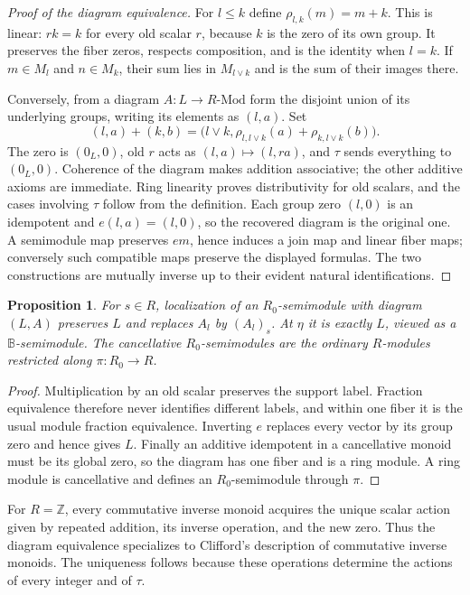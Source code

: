 \documentclass[11pt]{amsart}
\newcommand{\B}{\mathbb B}
\newcommand{\Z}{\mathbb Z}
\newcommand{\Mod}{\mathrm{Mod}}
\newtheorem{proposition}[theorem]{Proposition}
\theoremstyle{definition}
\theoremstyle{remark}
\begin{document}
\begin{proof}[Proof of the diagram equivalence]
For $l\le k$ define $\rho_{l,k}(m)=m+k$. This is linear: $rk=k$ for every old scalar $r$, because $k$ is the zero of its own group. It preserves the fiber zeros, respects composition, and is the identity when $l=k$. If $m\in M_l$ and $n\in M_k$, their sum lies in $M_{l\vee k}$ and is the sum of their images there.

Conversely, from a diagram $A:L\to R\text{-}\Mod$ form the disjoint union of its underlying groups, writing its elements as $(l,a)$. Set
\[
 (l,a)+(k,b)=\bigl(l\vee k,\rho_{l,l\vee k}(a)+\rho_{k,l\vee k}(b)\bigr).
\]
The zero is $(0_L,0)$, old $r$ acts as $(l,a)\mapsto(l,ra)$, and $\tau$ sends everything to $(0_L,0)$. Coherence of the diagram makes addition associative; the other additive axioms are immediate. Ring linearity proves distributivity for old scalars, and the cases involving $\tau$ follow from the definition. Each group zero $(l,0)$ is an idempotent and $e(l,a)=(l,0)$, so the recovered diagram is the original one. A semimodule map preserves $em$, hence induces a join map and linear fiber maps; conversely such compatible maps preserve the displayed formulas. The two constructions are mutually inverse up to their evident natural identifications.
\end{proof}

\begin{proposition}\label{prop:genericmodule}
For $s\in R$, localization of an $R_0$-semimodule with diagram $(L,A)$ preserves $L$ and replaces $A_l$ by $(A_l)_s$. At $\eta$ it is exactly $L$, viewed as a $\B$-semimodule. The cancellative $R_0$-semimodules are the ordinary $R$-modules restricted along $\pi:R_0\to R$.
\end{proposition}
\begin{proof}
Multiplication by an old scalar preserves the support label. Fraction equivalence therefore never identifies different labels, and within one fiber it is the usual module fraction equivalence. Inverting $e$ replaces every vector by its group zero and hence gives $L$. Finally an additive idempotent in a cancellative monoid must be its global zero, so the diagram has one fiber and is a ring module. A ring module is cancellative and defines an $R_0$-semimodule through $\pi$.
\end{proof}

For $R=\Z$, every commutative inverse monoid acquires the unique scalar action given by repeated addition, its inverse operation, and the new zero. Thus the diagram equivalence specializes to Clifford's description of commutative inverse monoids. The uniqueness follows because these operations determine the actions of every integer and of $\tau$.
\end{document}
